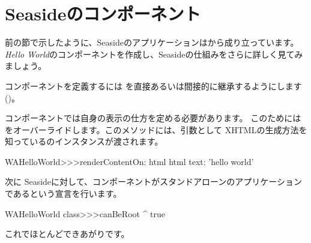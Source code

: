 \documentclass[a4paper,10pt,twoside]{book}
\begin{document}
\section{Seasideのコンポーネント}


前の節で示したように、Seasideのアプリケーションは\emph{}から成り立っています。
\emph{Hello World}のコンポーネントを作成し、Seasideの仕組みをさらに詳しく見てみましょう。

コンポーネントを定義するには を直接あるいは間接的に継承するようにします()。


コンポーネントでは自身の表示の仕方を定める必要があります。
このためにはをオーバーライドします。このメソッドには、引数として XHTMLの生成方法を知っているのインスタンスが渡されます。

\begin{code}{}
WAHelloWorld>>>renderContentOn: html
	html text: 'hello world'
\end{code}

\noindent
次に Seasideに対して、コンポーネントがスタンドアローンのアプリケーションであるという宣言を行います。


\begin{code}{}
WAHelloWorld class>>>canBeRoot
	^ true
\end{code}

\noindent
これでほとんどできあがりです。

\end{document}
